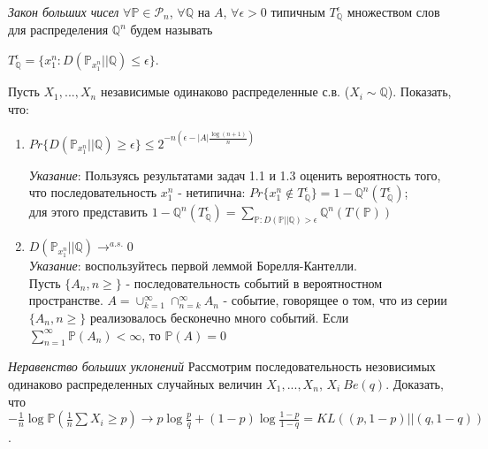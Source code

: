 \begin{problem}
\textit{Закон больших чисел}
$\forall \mathbb{P} \in \mathcal{P}_n $, $\forall \mathbb{Q}$ на $A$, $\forall \epsilon > 0$ типичным $T_{\mathbb{Q}}^{\epsilon}$ множеством слов для распределения $\mathbb{Q}^n$ будем называть
\begin{center}
$T_{\mathbb{Q}}^{\epsilon} = \{x_1^n: D(\mathbb{P}_{x_1^n}|| \mathbb{Q}) \leq \epsilon \}$.
\end{center}
Пусть $X_1, ..., X_n$ независимые одинаково распределенные с.в. ($X_i \sim \mathbb{Q}$). Показать, что:
\begin{enumerate}
\item 
\begin{center}
$Pr\{D(\mathbb{P}_{x_1^n} || \mathbb{Q}) \geq \epsilon \} \leq 2^{-n(\epsilon - |A|\frac{\log(n+1)}{n})}$
\end{center}
\textit{Указание}:
Пользуясь результатами задач 1.1 и 1.3 оценить вероятность того, что последовательность $x_1^n$ - нетипична: $Pr\{x_1^n \not\in T_{\mathbb{Q}}^{\epsilon}\} = 1 - \mathbb{Q}^n(T_{\mathbb{Q}}^{\epsilon})$;\\
для этого представить $1 - \mathbb{Q}^n(T_{\mathbb{Q}}^{\epsilon}) = \sum_{\mathbb{P}: D(\mathbb{P}||\mathbb{Q}) > \epsilon}{ \mathbb{Q}^n(T(\mathbb{P}))}$ 
\item $D(\mathbb{P}_{x_1^n}||\mathbb{Q})\rightarrow^{a.s.}0$\\
\textit{Указание}: воспользуйтесь первой леммой Борелля-Кантелли.\\
Пусть $\{A_n, n \geq \}$ - последовательность событий в вероятностном пространстве. $A = \cup_{k = 1}^{\infty} \cap_{n = k}^{\infty} A_n$ - событие, говорящее о том, что из серии $\{A_n, n \geq \}$ реализовалось бесконечно много событий.
Если $\sum_{n=1}^{\infty}\mathbb{P}(A_n) < \infty$, то $\mathbb{P}(A) = 0$
\end{enumerate}
\end{problem}

\begin{problem} \textit{Неравенство больших уклонений}
Рассмотрим последовательность незовисимых одинаково распределенных случайных величин $X_1, ..., X_n$, $X_i~Be(q)$. Доказать, что $-\frac{1}{n}\log \mathbb{P}(\frac{1}{n}\sum X_i \geq p) \rightarrow p\log \frac{p}{q} + (1-p)\log \frac{1-p}{1-q} = KL((p, 1-p)||(q, 1-q))$.
\begin{ordre}
\end{ordre}
\end{problem}

